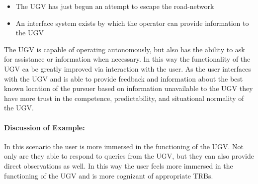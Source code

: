 \begin{itemize}
    \item The UGV has just begun an attempt to escape the road-network
    \item An interface system exists by which the operator can provide information to the UGV
\end{itemize}

The UGV is capable of operating autonomously, but also has the ability to ask for assistance or information when necessary. In this way the functionality of the UGV ca be greatly improved via interaction with the user. As the user interfaces with the UGV and is able to provide feedback and information about the best known location of the pursuer based on information unavailable to the UGV they have more trust in the competence, predictability, and situational normality of the UGV.

\paragraph{\textbf{Discussion of Example:}} In this scenario the user is more immersed in the functioning of the UGV. Not only are they able to respond to queries from the UGV, but they can also provide direct observations as well. In this way the user feels more immersed in the functioning of the UGV and is more cognizant of appropriate TRBs.
